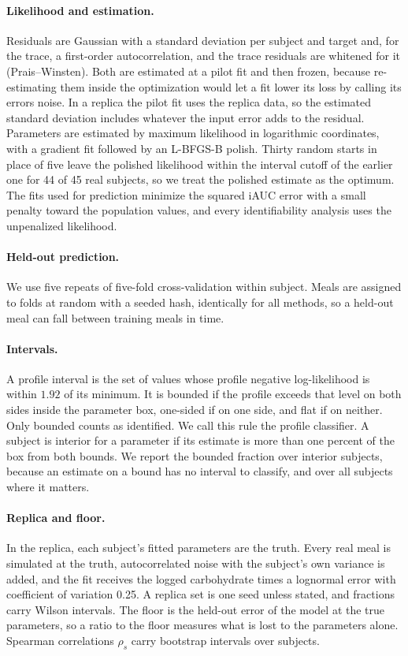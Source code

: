 \documentclass[letterpaper]{article} %
\newcommand{\resDeltaThreshold}{1.92}
\newcommand{\resGlobalN}{45}
\newcommand{\resGlobalWithinCount}{44}
\begin{document}
\paragraph{Likelihood and estimation.} Residuals are Gaussian with a standard deviation per subject and target and, for the trace, a first-order autocorrelation, and the trace residuals are whitened for it (Prais--Winsten). Both are estimated at a pilot fit and then frozen, because re-estimating them inside the optimization would let a fit lower its loss by calling its errors noise. In a replica the pilot fit uses the replica data, so the estimated standard deviation includes whatever the input error adds to the residual. Parameters are estimated by maximum likelihood in logarithmic coordinates, with a gradient fit followed by an L-BFGS-B polish. Thirty random starts in place of five leave the polished likelihood within the interval cutoff of the earlier one for \resGlobalWithinCount{} of \resGlobalN{} real subjects, so we treat the polished estimate as the optimum. The fits used for prediction minimize the squared iAUC error with a small penalty toward the population values, and every identifiability analysis uses the unpenalized likelihood.

\paragraph{Held-out prediction.} We use five repeats of five-fold cross-validation within subject. Meals are assigned to folds at random with a seeded hash, identically for all methods, so a held-out meal can fall between training meals in time.

\paragraph{Intervals.} A profile interval is the set of values whose profile negative log-likelihood is within $\resDeltaThreshold{}$ of its minimum. It is bounded if the profile exceeds that level on both sides inside the parameter box, one-sided if on one side, and flat if on neither. Only bounded counts as identified. We call this rule the profile classifier. A subject is interior for a parameter if its estimate is more than one percent of the box from both bounds. We report the bounded fraction over interior subjects, because an estimate on a bound has no interval to classify, and over all subjects where it matters.

\paragraph{Replica and floor.} In the replica, each subject's fitted parameters are the truth. Every real meal is simulated at the truth, autocorrelated noise with the subject's own variance is added, and the fit receives the logged carbohydrate times a lognormal error with coefficient of variation 0.25. A replica set is one seed unless stated, and fractions carry Wilson intervals. The floor is the held-out error of the model at the true parameters, so a ratio to the floor measures what is lost to the parameters alone. Spearman correlations $\rho_s$ carry bootstrap intervals over subjects.
\end{document}
